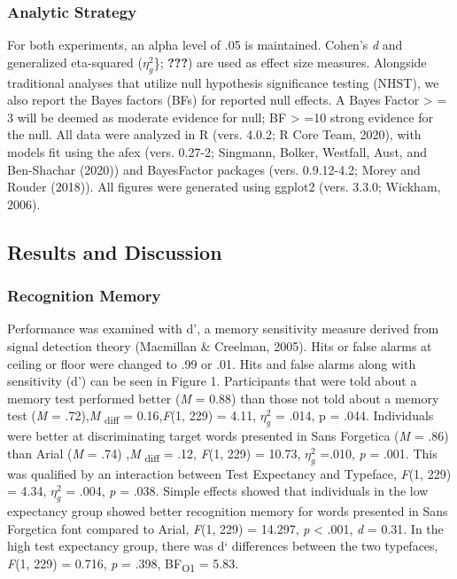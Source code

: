 \documentclass[
  english,
  man]{apa6}
\begin{document}
\hypertarget{analytic-strategy}{%
\subsubsection{Analytic Strategy}\label{analytic-strategy}}

For both experiments, an alpha level of .05 is maintained. Cohen's \emph{d} and generalized eta-squared (\(\eta_{g}^{2}\)\}; {\textbf{???}}) are used as effect size measures. Alongside traditional analyses that utilize null hypothesis significance testing (NHST), we also report the Bayes factors (BFs) for reported null effects. A Bayes Factor \textgreater{} = 3 will be deemed as moderate evidence for null; BF \textgreater{} =10 strong evidence for the null. All data were analyzed in R (vers. 4.0.2; R Core Team, 2020), with models fit using the afex (vers. 0.27-2; Singmann, Bolker, Westfall, Aust, and Ben-Shachar (2020)) and BayesFactor packages (vers. 0.9.12-4.2; Morey and Rouder (2018)). All figures were generated using ggplot2 (vers. 3.3.0; Wickham, 2006).

\hypertarget{results-and-discussion}{%
\subsection{Results and Discussion}\label{results-and-discussion}}

\hypertarget{recognition-memory}{%
\subsubsection{Recognition Memory}\label{recognition-memory}}

Performance was examined with d', a memory sensitivity measure derived from signal detection theory (Macmillan \& Creelman, 2005). Hits or false alarms at ceiling or floor were changed to .99 or .01. Hits and false alarms along with sensitivity (d') can be seen in Figure 1. Participants that were told about a memory test performed better (\emph{M} = 0.88) than those not told about a memory test (\emph{M} = .72),\emph{M} \textsubscript{diff} = 0.16,\emph{F}(1, 229) = 4.11, \(\eta_{g}^{2}\) = .014, p = .044. Individuals were better at discriminating target words presented in Sans Forgetica (\emph{M} = .86) than Arial (\emph{M} = .74) ,\emph{M} \textsubscript{diff} = .12, \emph{F}(1, 229) = 10.73, \(\eta_{g}^{2}\) =.010, \emph{p} = .001. This was qualified by an interaction between Test Expectancy and Typeface, \emph{F}(1, 229) = 4.34, \(\eta_{g}^{2}\) = .004, \emph{p} = .038. Simple effects showed that individuals in the low expectancy group showed better recognition memory for words presented in Sans Forgetica font compared to Arial, \emph{F}(1, 229) = 14.297, \emph{p} \textless{} .001, \emph{d} = 0.31. In the high test expectancy group, there was d` differences between the two typefaces, \emph{F}(1, 229) = 0.716, \emph{p} = .398, BF\textsubscript{O1} = 5.83.
\end{document}

